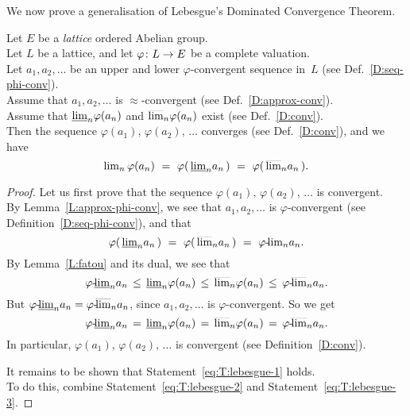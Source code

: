 \documentclass[main.tex]{subfiles}
\begin{document}
%
%
\noindent
We now prove a generalisation 
of Lebesgue's Dominated Convergence Theorem.
\begin{thm}[Lebesgue]
\label{T:lebesgue}
Let $E$ be a \emph{lattice} ordered Abelian group.\\
Let $L$ be a lattice,
and let $\varphi\colon L \rightarrow E$ be a 
complete valuation.\\
Let $a_1,a_2,\dotsc$ be an upper and lower $\varphi$-convergent
sequence in~$L$
(see Def.~\ref{D:seq-phi-conv}). \\
Assume that $a_1,a_2,\dotsc$ is $\approx$-convergent
(see Def.~\ref{D:approx-conv}). \\
Assume that $\smash{\underline{\lim}_{n}}\varphi(a_n)$ and $\smash{\overline{\lim}_{n}}\varphi(a_n)$ exist
(see Def.~\ref{D:conv}).\\
Then 
the sequence $\varphi(a_1),\,\varphi(a_2),\,\dotsc$
converges (see Def.~\ref{D:conv}), and we have
\begin{equation}
\label{eq:T:lebesgue-1}
{\lim}_n \,\varphi(a_n)
\ =\ 
\varphi(\,\llim{n} a_n\,)
\ =\ 
\varphi(\,\ulim{n} a_n\,).
\end{equation}
\end{thm}
\begin{proof}
Let us first prove that the sequence 
$\varphi(a_1),\,\varphi(a_2),\,\dotsc$
is convergent.\\
By Lemma~\eqref{L:approx-phi-conv},
we see that
 $a_1,a_2,\dotsc$
is $\varphi$-convergent (see Definition~\ref{D:seq-phi-conv}),
and that
\begin{equation}
\label{eq:T:lebesgue-2}
\varphi(\,\llim{n}a_n\,) \ =\  \varphi(\,\ulim{n} a_n\,) 
\ =\ 
\plim\varphi{n} a_n.
\end{equation}
By Lemma~\ref{L:fatou} and its dual, we see that
\begin{equation*}
{\varphi}\text{-}\!\smash{\underline{\lim}_{n}}a_n \,\leq\,
\smash{\underline{\lim}_{n}}\varphi(a_n) \,\leq\,
\smash{\overline{\lim}_{n}}\varphi(a_n) \,\leq\,
{\varphi}\text{-}\!\smash{\overline{\lim}_{n}}a_n.
\end{equation*}
But ${\varphi}\text{-}\!\smash{\underline{\lim}_{n}}a_n = {\varphi}\text{-}\!\smash{\overline{\lim}_{n}}a_n$,
since $a_1,a_2,\dotsc$ is $\varphi$-convergent.
So we get 
\begin{equation}
\label{eq:T:lebesgue-3}
{\varphi}\text{-}\!\smash{\underline{\lim}_{n}}a_n \,=\,
\smash{\underline{\lim}_{n}}\varphi(a_n) \,=\,
\smash{\overline{\lim}_{n}}\varphi(a_n) \,=\,
{\varphi}\text{-}\!\smash{\overline{\lim}_{n}}a_n.
\end{equation}
In particular,
$\varphi(a_1),\,\varphi(a_2),\,\dotsc$
is convergent
(see Definition~\ref{D:conv}).

It remains to be shown that 
Statement~\eqref{eq:T:lebesgue-1} holds.\\
To do this,
combine Statement~\eqref{eq:T:lebesgue-2}
and Statement~\eqref{eq:T:lebesgue-3}.
\end{proof}
\end{document}
